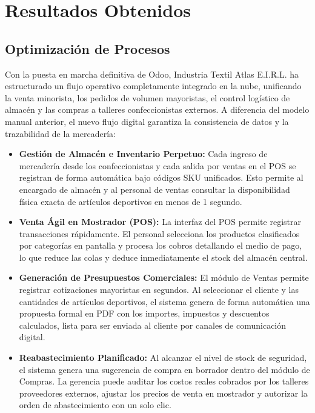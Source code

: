 \section{Resultados Obtenidos}

\subsection{Optimización de Procesos}

Con la puesta en marcha definitiva de Odoo, Industria Textil Atlas E.I.R.L. ha estructurado un flujo operativo completamente integrado en la nube, unificando la venta minorista, los pedidos de volumen mayoristas, el control logístico de almacén y las compras a talleres confeccionistas externos. A diferencia del modelo manual anterior, el nuevo flujo digital garantiza la consistencia de datos y la trazabilidad de la mercadería:

\begin{itemize}
    \item \textbf{Gestión de Almacén e Inventario Perpetuo:} Cada ingreso de mercadería desde los confeccionistas y cada salida por ventas en el POS se registran de forma automática bajo códigos SKU unificados. Esto permite al encargado de almacén y al personal de ventas consultar la disponibilidad física exacta de artículos deportivos en menos de 1 segundo.
    \item \textbf{Venta Ágil en Mostrador (POS):} La interfaz del POS permite registrar transacciones rápidamente. El personal selecciona los productos clasificados por categorías en pantalla y procesa los cobros detallando el medio de pago, lo que reduce las colas y deduce inmediatamente el stock del almacén central.
    \item \textbf{Generación de Presupuestos Comerciales:} El módulo de Ventas permite registrar cotizaciones mayoristas en segundos. Al seleccionar el cliente y las cantidades de artículos deportivos, el sistema genera de forma automática una propuesta formal en PDF con los importes, impuestos y descuentos calculados, lista para ser enviada al cliente por canales de comunicación digital.
    \item \textbf{Reabastecimiento Planificado:} Al alcanzar el nivel de stock de seguridad, el sistema genera una sugerencia de compra en borrador dentro del módulo de Compras. La gerencia puede auditar los costos reales cobrados por los talleres proveedores externos, ajustar los precios de venta en mostrador y autorizar la orden de abastecimiento con un solo clic.
\end{itemize}

